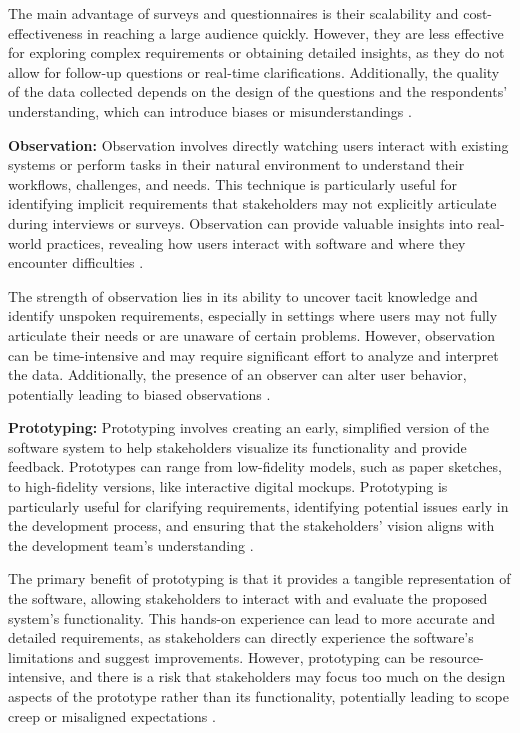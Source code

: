 \begin{refsection}
The main advantage of surveys and questionnaires is their scalability and cost-effectiveness in reaching a large audience quickly. However, they are less effective for exploring complex requirements or obtaining detailed insights, as they do not allow for follow-up questions or real-time clarifications. Additionally, the quality of the data collected depends on the design of the questions and the respondents' understanding, which can introduce biases or misunderstandings \cite[pp.~90-110]{rogers2023interaction}.

\textbf{Observation:} Observation involves directly watching users interact with existing systems or perform tasks in their natural environment to understand their workflows, challenges, and needs. This technique is particularly useful for identifying implicit requirements that stakeholders may not explicitly articulate during interviews or surveys. Observation can provide valuable insights into real-world practices, revealing how users interact with software and where they encounter difficulties \cite[pp.~55-75]{seaman1999qualitative}.

The strength of observation lies in its ability to uncover tacit knowledge and identify unspoken requirements, especially in settings where users may not fully articulate their needs or are unaware of certain problems. However, observation can be time-intensive and may require significant effort to analyze and interpret the data. Additionally, the presence of an observer can alter user behavior, potentially leading to biased observations \cite[pp.~78-92]{preece2015interaction}.

\textbf{Prototyping:} Prototyping involves creating an early, simplified version of the software system to help stakeholders visualize its functionality and provide feedback. Prototypes can range from low-fidelity models, such as paper sketches, to high-fidelity versions, like interactive digital mockups. Prototyping is particularly useful for clarifying requirements, identifying potential issues early in the development process, and ensuring that the stakeholders' vision aligns with the development team's understanding \cite[pp.~25-40]{brooks2010design}.

The primary benefit of prototyping is that it provides a tangible representation of the software, allowing stakeholders to interact with and evaluate the proposed system's functionality. This hands-on experience can lead to more accurate and detailed requirements, as stakeholders can directly experience the software's limitations and suggest improvements. However, prototyping can be resource-intensive, and there is a risk that stakeholders may focus too much on the design aspects of the prototype rather than its functionality, potentially leading to scope creep or misaligned expectations \cite[pp.~97-115]{nuseibeh2010requirements}.


\end{refsection}
